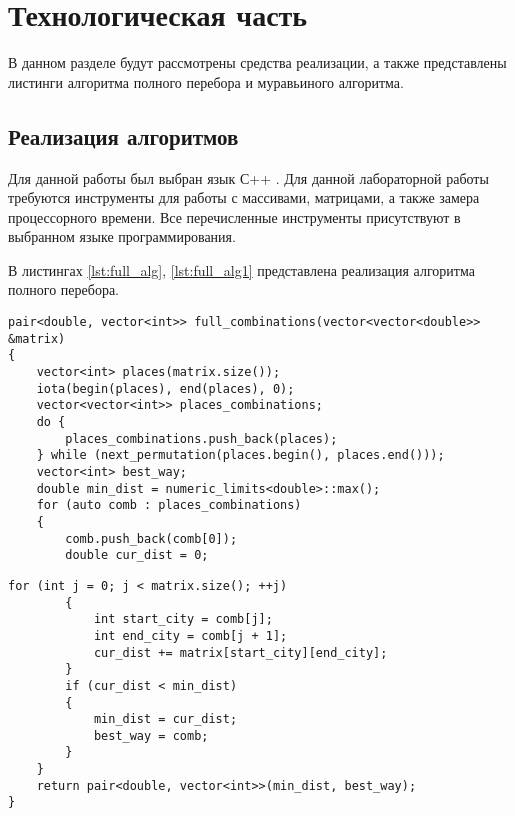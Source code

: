 \chapter{Технологическая часть}
В данном разделе будут рассмотрены средства реализации, а также представлены листинги алгоритма полного перебора и муравьиного алгоритма.

\section{Реализация алгоритмов}
Для данной работы был выбран язык С++ \cite{cpp}. Для данной лабораторной работы требуются инструменты для работы с массивами, матрицами, а также замера процессорного времени. Все перечисленные инструменты присутствуют в выбранном языке программирования.

В листингах \ref{lst:full_alg}, \ref{lst:full_alg1} представлена реализация алгоритма полного перебора.

\begin{center}
	\begin{lstlisting}[label=lst:full_alg,caption=Алгоритм полного перебора (начало)]
pair<double, vector<int>> full_combinations(vector<vector<double>> &matrix)
{
	vector<int> places(matrix.size());
	iota(begin(places), end(places), 0);
	vector<vector<int>> places_combinations;
	do {
		places_combinations.push_back(places);
	} while (next_permutation(places.begin(), places.end()));
	vector<int> best_way;
	double min_dist = numeric_limits<double>::max();
	for (auto comb : places_combinations)
	{
		comb.push_back(comb[0]);
		double cur_dist = 0;
			\end{lstlisting}
		\clearpage
	\begin{lstlisting}[label=lst:full_alg1,caption=Алгоритм полного перебора (окончание)]
		for (int j = 0; j < matrix.size(); ++j)
		{
			int start_city = comb[j];
			int end_city = comb[j + 1];
			cur_dist += matrix[start_city][end_city];
		}
		if (cur_dist < min_dist)
		{
			min_dist = cur_dist;
			best_way = comb;
		}
	}
	return pair<double, vector<int>>(min_dist, best_way);
}
	\end{lstlisting}
\end{center}


